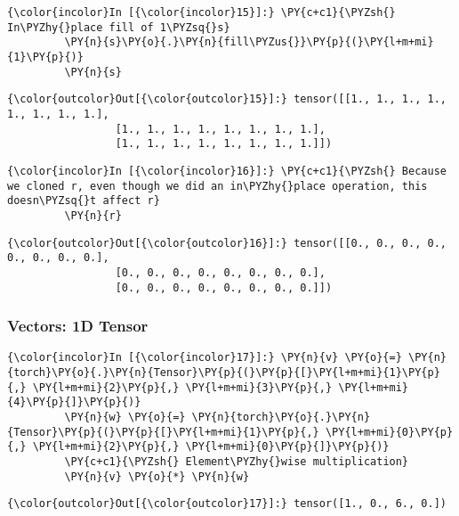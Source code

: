 \begin{Verbatim}[commandchars=\\\{\}]
{\color{incolor}In [{\color{incolor}15}]:} \PY{c+c1}{\PYZsh{} In\PYZhy{}place fill of 1\PYZsq{}s}
         \PY{n}{s}\PY{o}{.}\PY{n}{fill\PYZus{}}\PY{p}{(}\PY{l+m+mi}{1}\PY{p}{)} 
         \PY{n}{s}
\end{Verbatim}


\begin{Verbatim}[commandchars=\\\{\}]
{\color{outcolor}Out[{\color{outcolor}15}]:} tensor([[1., 1., 1., 1., 1., 1., 1., 1.],
                 [1., 1., 1., 1., 1., 1., 1., 1.],
                 [1., 1., 1., 1., 1., 1., 1., 1.]])
\end{Verbatim}
            
\begin{Verbatim}[commandchars=\\\{\}]
{\color{incolor}In [{\color{incolor}16}]:} \PY{c+c1}{\PYZsh{} Because we cloned r, even though we did an in\PYZhy{}place operation, this doesn\PYZsq{}t affect r}
         \PY{n}{r} 
\end{Verbatim}


\begin{Verbatim}[commandchars=\\\{\}]
{\color{outcolor}Out[{\color{outcolor}16}]:} tensor([[0., 0., 0., 0., 0., 0., 0., 0.],
                 [0., 0., 0., 0., 0., 0., 0., 0.],
                 [0., 0., 0., 0., 0., 0., 0., 0.]])
\end{Verbatim}
          

\subsubsection{Vectors: 1D Tensor}
\begin{Verbatim}[commandchars=\\\{\}]
{\color{incolor}In [{\color{incolor}17}]:} \PY{n}{v} \PY{o}{=} \PY{n}{torch}\PY{o}{.}\PY{n}{Tensor}\PY{p}{(}\PY{p}{[}\PY{l+m+mi}{1}\PY{p}{,} \PY{l+m+mi}{2}\PY{p}{,} \PY{l+m+mi}{3}\PY{p}{,} \PY{l+m+mi}{4}\PY{p}{]}\PY{p}{)}
         \PY{n}{w} \PY{o}{=} \PY{n}{torch}\PY{o}{.}\PY{n}{Tensor}\PY{p}{(}\PY{p}{[}\PY{l+m+mi}{1}\PY{p}{,} \PY{l+m+mi}{0}\PY{p}{,} \PY{l+m+mi}{2}\PY{p}{,} \PY{l+m+mi}{0}\PY{p}{]}\PY{p}{)}
         \PY{c+c1}{\PYZsh{} Element\PYZhy{}wise multiplication}
         \PY{n}{v} \PY{o}{*} \PY{n}{w} 
\end{Verbatim}


\begin{Verbatim}[commandchars=\\\{\}]
{\color{outcolor}Out[{\color{outcolor}17}]:} tensor([1., 0., 6., 0.])
\end{Verbatim}
            
